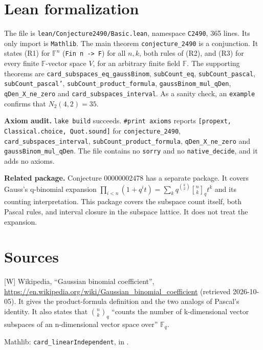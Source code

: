 \documentclass[11pt]{article}
\theoremstyle{definition}
\newcommand{\qb}[2]{\genfrac{[}{]}{0pt}{}{#1}{#2}_{q}}
\newcommand{\F}{\mathbb{F}}
\begin{document}
\section{Lean formalization}

The file is \texttt{lean/Conjecture2490/Basic.lean}, namespace \texttt{C2490}, 365 lines. Its
only import is \texttt{Mathlib}. The main theorem \texttt{conjecture\_2490} is a conjunction.
It states (R1) for $\F^n$ (\texttt{Fin n -> F}) for all $n,k$, both rules of (R2), and (R3) for
every finite $\F$-vector space $V$, for an arbitrary finite field $\F$. The supporting theorems
are \texttt{card\_subspaces\_eq\_gaussBinom}, \texttt{subCount\_eq},
\texttt{subCount\_pascal}, \texttt{subCount\_pascal'}, \texttt{subCount\_product\_formula},
\texttt{gaussBinom\_mul\_qDen}, \texttt{qDen\_X\_ne\_zero} and \texttt{card\_subspaces\_interval}.
As a sanity check, an \texttt{example} confirms that $N_2(4,2)=35$.

\textbf{Axiom audit.} \texttt{lake build} succeeds. \texttt{\#print axioms} reports
\texttt{[propext, Classical.choice, Quot.sound]} for \texttt{conjecture\_2490},
\texttt{card\_subspaces\_interval}, \texttt{subCount\_product\_formula},
\texttt{qDen\_X\_ne\_zero} and \texttt{gaussBinom\_mul\_qDen}. The file contains no
\texttt{sorry} and no \texttt{native\_decide}, and it adds no axioms.

\textbf{Related package.} Conjecture 00000002478 has a separate package. It covers Gauss's
q-binomial expansion $\prod_{i<n}(1+q^it)=\sum_k q^{\binom k2}\qb nk t^k$ and its counting
interpretation. This package covers the subspace count itself, both Pascal rules, and interval
closure in the subspace lattice. It does not treat the expansion.

\section*{Sources}
[W] Wikipedia, ``Gaussian binomial coefficient'',
\url{https://en.wikipedia.org/wiki/Gaussian_binomial_coefficient} (retrieved 2026-10-05). It
gives the product-formula definition and the two analogs of Pascal's identity. It also states
that $\binom nk_q$ ``counts the number of k-dimensional vector subspaces of an n-dimensional
vector space over'' $\F_q$.

Mathlib: \texttt{card\_linearIndependent}, in
.
\end{document}
